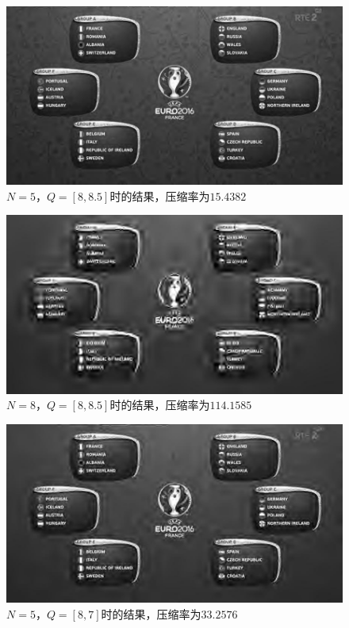 \documentclass[UTF8]{ctexart}
\begin{document}
             			\begin{figure}[H]
             				\centering 
             				\includegraphics[scale=0.4]{n_5_q_8_8-5.jpg} 
             				\caption{$N = 5$，$Q = [8, 8.5]$时的结果，压缩率为$15.4382$} 
             				\label{n=5, Q=[8,8.5]}
             			\end{figure} 
                         
             			\begin{figure}[H]
             				\centering 
             				\includegraphics[scale=0.4]{n_8_q_8_8-5.jpg} 
             				\caption{$N = 8$，$Q = [8, 8.5]$时的结果，压缩率为$114.1585$} 
             				\label{n=8, Q=[8,8.5]}
             			\end{figure} 
                         
             			\begin{figure}[H]
             				\centering 
             				\includegraphics[scale=0.4]{n_5_q_8_7.jpg} 
             				\caption{$N = 5$，$Q = [8, 7]$时的结果，压缩率为$33.2576$} 
             				\label{n=5, Q=[8,7]}
             			\end{figure}
                         
\end{document}
